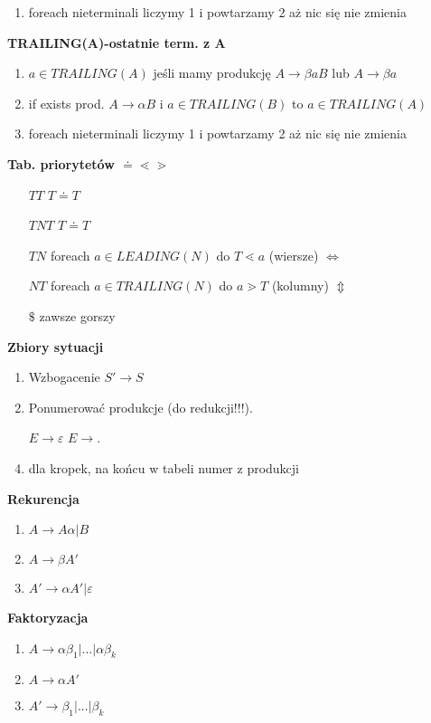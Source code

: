 \begin{multicols}{3}
\begin{enumerate}
      \item foreach nieterminali liczymy 1 i powtarzamy 2 aż nic się nie zmienia
    \end{enumerate}
    \textbf{TRAILING(A)-ostatnie term. z A}
    \begin{enumerate}
      \item	$a \in TRAILING(A)$ jeśli mamy produkcję $A\rightarrow \beta aB$ lub $A \rightarrow \beta a$ 
      \item if exists prod. $A\rightarrow \alpha B$ i $a \in TRAILING(B)$ to $a \in TRAILING(A)$
      \item foreach nieterminali liczymy 1 i powtarzamy 2 aż nic się nie zmienia
    \end{enumerate}
    \textbf{Tab. priorytetów $\doteq \lessdot \gtrdot $}
    \begin{enumerate}
      \item [$TT$] $T \doteq T$
      \item [$TNT$] $T \doteq T$
      \item [$TN$] foreach $a \in LEADING(N)$ do $T \lessdot a$ (wiersze) $ \Leftrightarrow $
      \item [$NT$] foreach $a \in TRAILING(N)$ do $a \gtrdot T$ (kolumny) $ \Updownarrow $
      \item [$\$$] zawsze gorszy
    \end{enumerate}
    \textbf{Zbiory sytuacji}
    \begin{enumerate}
      \item Wzbogacenie $ S' \rightarrow S$ 
      \item Ponumerować produkcje (do redukcji!!!).
      \item [$ E \rightarrow \varepsilon $] $E \rightarrow . $
      \item dla kropek, na końcu w tabeli numer z produkcji
    \end{enumerate}
    \textbf{Rekurencja}
    \begin{enumerate}
      \item $A \rightarrow A \alpha | B$
      \item $A \rightarrow \beta A'$
      \item $A' \rightarrow \alpha A' | \varepsilon $
    \end{enumerate}
    \textbf{Faktoryzacja}
    \begin{enumerate}
      \item $A \rightarrow \alpha \beta _{1}|...|\alpha \beta _{k}$
      \item $A \rightarrow \alpha A'$
      \item $A' \rightarrow \beta _{1}|...|\beta _{k}$
    \end{enumerate}
\end{multicols}
 